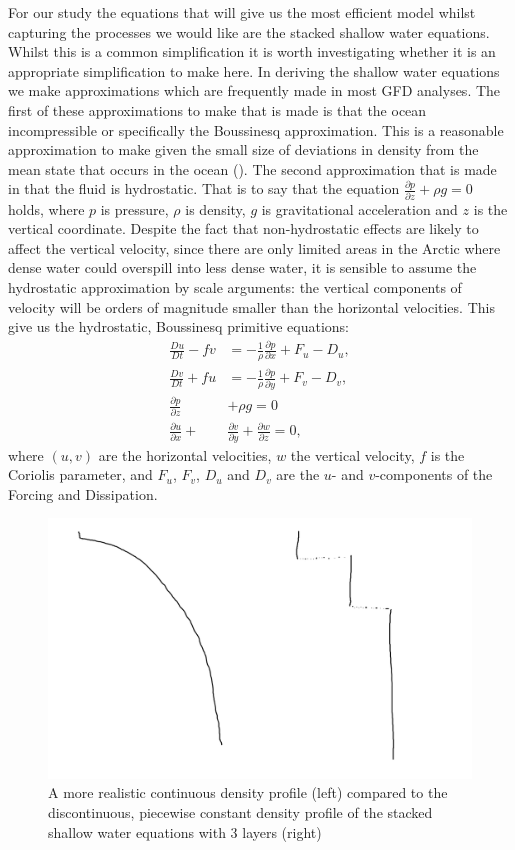\documentclass[10pt,a4paper]{article}
\begin{document}
For our study the equations that will give us the most efficient model whilst capturing the
 processes we would like are the stacked shallow water equations. Whilst this is a common
  simplification it is worth investigating whether it is an appropriate simplification to make
   here. 
   In deriving the shallow water equations we make approximations which are frequently made in
   most GFD analyses. The first of these approximations to make that is made is that the ocean
   incompressible or specifically the Boussinesq approximation. This is a reasonable
   approximation to make given the small size of deviations in density from the mean state
   that occurs in the ocean (\cite{vallis2006atmospheric}).
   The second approximation that is made in that the fluid is hydrostatic. That is to say that the equation $\frac{\partial p}{\partial z} + \rho g=0$ holds, where $p$ is pressure, $\rho$
   is density, $g$ is gravitational acceleration and $z$ is the vertical coordinate. Despite
   the fact that non-hydrostatic effects are likely to affect the vertical velocity, since
   there are only limited areas in the Arctic where dense water could overspill into less
   dense water, it is sensible to assume the hydrostatic approximation by scale arguments:
   the vertical components of velocity will be orders of magnitude smaller than the
   horizontal velocities. This give us the hydrostatic, Boussinesq  primitive equations:
   \begin{equation}
   \begin{split}
   \frac{Du}{Dt}-fv &= -\frac{1}{\rho}   \frac{\partial p}{\partial x}+F_{u}-D_{u}, \\
   \frac{Dv}{Dt}+fu &= -\frac{1}{\rho}   \frac{\partial p}{\partial y}+F_{v}-D_{v}, \\
   \frac{\partial p}{\partial z} &+ \rho g=0 \\
   \frac{\partial u}{\partial x} + &\frac{\partial v}{\partial y} +\frac{\partial w}{\partial z}  = 0 ,
   \end{split}
   \end{equation}
   where $(u,v)$ are the horizontal velocities, $w$ the vertical velocity, $f$ is the Coriolis
    parameter, and $F_{u}$, $F_{v}$, $D_{u}$ and  $D_{v}$ are the $u$- and $v$-components of
    the Forcing and  Dissipation.
    
    
    \begin{figure}
    	\centering
    	\includegraphics[width=0.5\linewidth]{SWDensity}
    	\caption[Shallow Water Density Profile]{  A more realistic  continuous
    		density profile (left) compared to the discontinuous, piecewise constant 
    		density profile of the stacked shallow water equations with 3 layers (right)}
    	\label{fig:swdensity}
    \end{figure}
    
\end{document}
